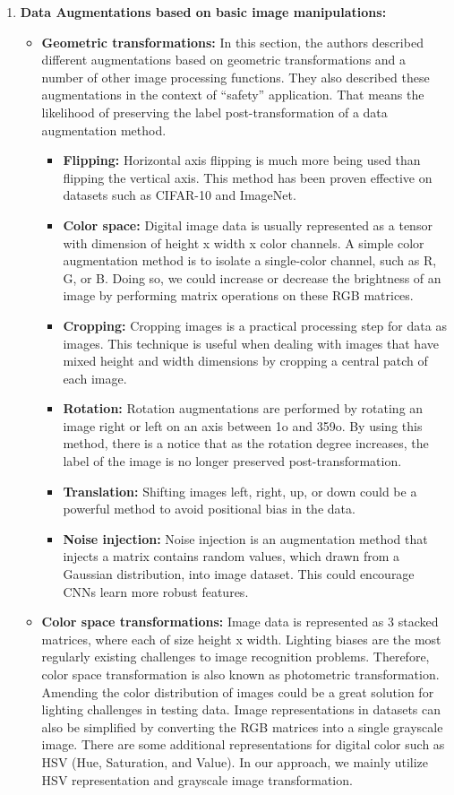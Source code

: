 \documentclass[10pt,twocolumn,letterpaper]{article}
\begin{document}
\begin{enumerate}
    \item \textbf{Data Augmentations based on basic image manipulations:}
    \begin{itemize}
        \item \textbf{Geometric transformations:} In this section, the authors described different augmentations based on geometric transformations and a number of other image processing functions. They also described these augmentations in the context of “safety” application. That means the likelihood of preserving the label post-transformation of a data augmentation method.
        \begin{itemize}
            \item \textbf{Flipping:} Horizontal axis flipping is much more being used than flipping the vertical axis. This method has been proven effective on datasets such as CIFAR-10 and ImageNet.
            \item \textbf{Color space:} Digital image data is usually represented as a tensor with dimension of height x width x color channels. A simple color augmentation method is to isolate a single-color channel, such as R, G, or B. Doing so, we could increase or decrease the brightness of an image by performing matrix operations on these RGB matrices.
            \item \textbf{Cropping:} Cropping images is a practical processing step for data as images. This technique is useful when dealing with images that have mixed height and width dimensions by cropping a central patch of each image.
            \item \textbf{Rotation:} Rotation augmentations are performed by rotating an image right or left on an axis between 1o and 359o. By using this method, there is a notice that as the rotation degree increases, the label of the image is no longer preserved post-transformation.
            \item \textbf{Translation:} Shifting images left, right, up, or down could be a powerful method to avoid positional bias in the data.
            \item \textbf{Noise injection:} Noise injection is an augmentation method that injects a matrix contains random values, which drawn from a Gaussian distribution, into image dataset. This could encourage CNNs learn more robust features.
        \end{itemize}
        \item \textbf{Color space transformations:} Image data is represented as 3 stacked matrices, where each of size height x width. Lighting biases are the most regularly existing challenges to image recognition problems. Therefore, color space transformation is also known as photometric transformation. Amending the color distribution of images could be a great solution for lighting challenges in testing data. Image representations in datasets can also be simplified by converting the RGB matrices into a single grayscale image. There are some additional representations for digital color such as HSV (Hue, Saturation, and Value). In our approach, we mainly utilize HSV representation and grayscale image transformation.

\end{itemize}
\end{enumerate}
\end{document}
